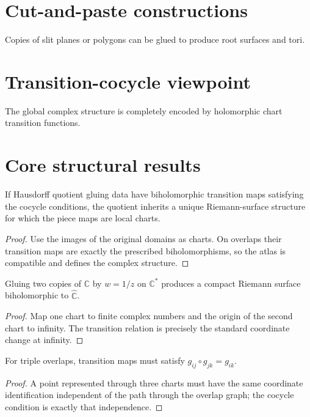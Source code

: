 \section{Cut-and-paste constructions}
Copies of slit planes or polygons can be glued to produce root surfaces and tori.

\section{Transition-cocycle viewpoint}
The global complex structure is completely encoded by holomorphic chart transition functions.

\section{Core structural results}

\begin{theorem}\label{thm:iv25-01}
If Hausdorff quotient gluing data have biholomorphic transition maps satisfying the cocycle conditions, the quotient inherits a unique Riemann-surface structure for which the piece maps are local charts.
\begin{proof}
Use the images of the original domains as charts. On overlaps their transition maps are exactly the prescribed biholomorphisms, so the atlas is compatible and defines the complex structure.
\end{proof}
\end{theorem}

\begin{theorem}\label{thm:iv25-02}
Gluing two copies of $\mathbb C$ by $w=1/z$ on $\mathbb C^*$ produces a compact Riemann surface biholomorphic to $\widehat{\mathbb C}$.
\begin{proof}
Map one chart to finite complex numbers and the origin of the second chart to infinity. The transition relation is precisely the standard coordinate change at infinity.
\end{proof}
\end{theorem}

\begin{theorem}\label{thm:iv25-03}
For triple overlaps, transition maps must satisfy $g_{ij}\circ g_{jk}=g_{ik}$.
\begin{proof}
A point represented through three charts must have the same coordinate identification independent of the path through the overlap graph; the cocycle condition is exactly that independence.
\end{proof}
\end{theorem}

